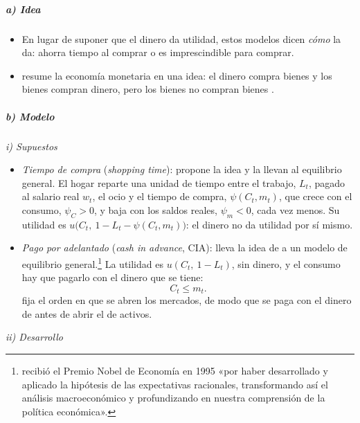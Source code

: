 \documentclass[11pt]{article}
\begin{document}
\subparagraph{a) Idea}

\begin{itemize}
\item En lugar de suponer que el dinero da utilidad, estos modelos dicen \emph{cómo} la da: ahorra tiempo al comprar o es imprescindible para comprar.
\item \textcite{Clower1967Reconsideration} resume la economía monetaria en una idea: el dinero compra bienes y los bienes compran dinero, pero los bienes no compran bienes .
\end{itemize}

\subparagraph{b) Modelo}

\hspace*{3.6em}\emph{i) Supuestos}

\begin{itemize}
\item \emph{Tiempo de compra} (\emph{shopping time}): \textcite{Saving1971Transactions} propone la idea y \textcite{McCallumGoodfriend1987Demand} la llevan al equilibrio general. El hogar reparte una unidad de tiempo entre el trabajo, $L_t$, pagado al salario real $w_t$, el ocio y el tiempo de compra, $\psi(C_t,m_t)$, que crece con el consumo, $\psi_C>0$, y baja con los saldos reales, $\psi_m<0$, cada vez menos. Su utilidad es $u\big(C_t,\ 1-L_t-\psi(C_t,m_t)\big)$: el dinero no da utilidad por sí mismo.
\item \emph{Pago por adelantado} (\emph{cash in advance}, CIA): \textcite{Lucas1980Equilibrium} lleva la idea de  a un modelo de equilibrio general.\footnote{ recibió el Premio Nobel de Economía en 1995 «por haber desarrollado y aplicado la hipótesis de las expectativas racionales, transformando así el análisis macroeconómico y profundizando en nuestra comprensión de la política económica»\nocite{NobelPrize1995Lucas}.} La utilidad es $u(C_t,\ 1-L_t)$, sin dinero, y el consumo hay que pagarlo con el dinero que se tiene:
  \begin{equation}
  C_t\leq m_t. \label{eq:cia}
  \end{equation}
  \textcite{Svensson1985Money} fija el orden en que se abren los mercados, de modo que se paga con el dinero de antes de abrir el de activos.
\end{itemize}

\hspace*{3.6em}\emph{ii) Desarrollo}
\end{document}
